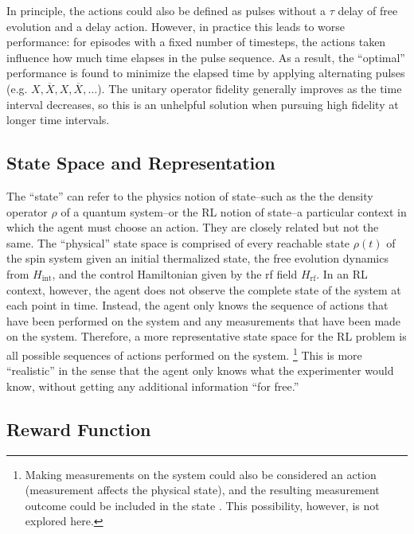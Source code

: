 In principle, the actions could also be defined as pulses without a $\tau$ delay of free evolution and a delay action. However, in practice this leads to worse performance: for episodes with a fixed number of timesteps, the actions taken influence how much time elapses in the pulse sequence. As a result, the ``optimal'' performance is found to minimize the elapsed time by applying alternating pulses (e.g. $X, \overline{X}, X, \overline{X}, \dots$).
The unitary operator fidelity generally improves as the time interval decreases, so this is an unhelpful solution when pursuing high fidelity at longer time intervals.

\subsection{State Space and Representation}

The ``state'' can refer to the physics notion of state--such as the the density operator $\rho$ of a quantum system--or the RL notion of state--a particular context in which the agent must choose an action. They are closely related but not the same.
The ``physical'' state space is comprised of every reachable state $\rho(t)$ of the spin system given an initial thermalized state, the free evolution dynamics from $H_{\text{int}}$, and the control Hamiltonian given by the rf field $H_{\text{rf}}$.
In an RL context, however, the agent does not observe the complete state of the system at each point in time. Instead, the agent only knows the sequence of actions that have been performed on the system and any measurements that have been made on the system.
Therefore, a more representative state space for the RL problem is all possible sequences of actions performed on the system.%
\footnote{
Making measurements on the system could also be considered an action (measurement affects the physical state), and the resulting measurement outcome could be included in the state \cite{porotti2019coherent}. This possibility, however, is not explored here.
}
This is more ``realistic'' in the sense that the agent only knows what the experimenter would know, without getting any additional information ``for free.''

\subsection{Reward Function}


